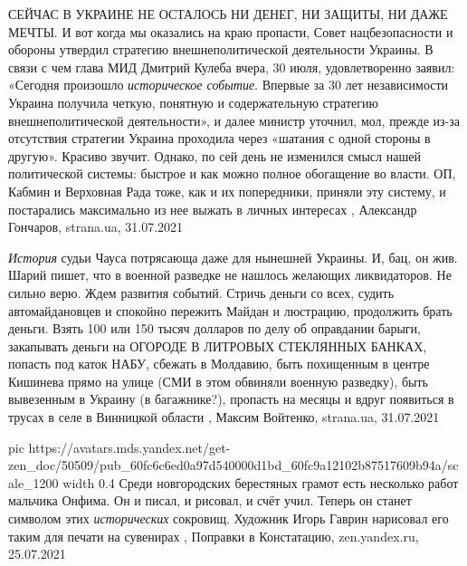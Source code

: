СЕЙЧАС В УКРАИНЕ НЕ ОСТАЛОСЬ НИ ДЕНЕГ, НИ ЗАЩИТЫ, НИ ДАЖЕ МЕЧТЫ.  И вот когда
мы оказались на краю пропасти, Совет нацбезопасности и обороны утвердил
стратегию внешнеполитической деятельности Украины. В связи с чем глава МИД
Дмитрий Кулеба вчера, 30 июля, удовлетворенно заявил: «Сегодня произошло
\emph{историческое событие}. Впервые за 30 лет независимости Украина получила четкую,
понятную и содержательную стратегию внешнеполитической деятельности», и далее
министр уточнил, мол, прежде из-за отсутствия стратегии Украина проходила через
«шатания с одной стороны в другую».  Красиво звучит. Однако, по сей день не
изменился смысл нашей политической системы: быстрое и как можно полное
обогащение во власти. ОП, Кабмин и Верховная Рада тоже, как и их попередники,
приняли эту систему, и постарались максимально из нее выжать в личных
интересах
, 
Александр Гончаров, strana.ua, 31.07.2021

\emph{История} судьи Чауса потрясающа даже для нынешней Украины. И, бац, он жив. Шарий
пишет, что в военной разведке не нашлось желающих ликвидаторов. Не сильно верю.
Ждем развития событий.  Стричь деньги со всех, судить автомайдановцев и
спокойно пережить Майдан и люстрацию, продолжить брать деньги. Взять 100 или
150 тысяч долларов по делу об оправдании барыги, закапывать деньги на ОГОРОДЕ В
ЛИТРОВЫХ СТЕКЛЯННЫХ БАНКАХ, попасть под каток НАБУ, сбежать в Молдавию, быть
похищенным в центре Кишинева прямо на улице (СМИ в этом обвиняли военную
разведку), быть вывезенным в Украину (в багажнике?), пропасть на месяцы и вдруг
появиться в трусах в селе в Винницкой области
, 
Максим Войтенко, strana.ua, 31.07.2021

\ifcmt
  pic https://avatars.mds.yandex.net/get-zen_doc/50509/pub_60fc6c6ed0a97d540000d1bd_60fc9a12102b87517609b94a/scale_1200
  width 0.4
\fi
Среди новгородских берестяных грамот есть несколько работ мальчика Онфима. Он и
писал, и рисовал, и счёт учил. Теперь он станет символом этих \emph{исторических}
сокровищ. Художник Игорь Гаврин нарисовал его таким для печати на сувенирах
, 
Поправки в Констатацию, zen.yandex.ru, 25.07.2021 

